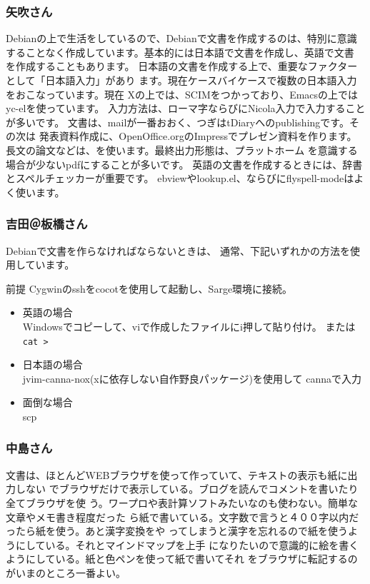 \documentclass[mingoth,a4paper]{jsarticle}
\begin{document}
\subsubsection{矢吹さん}

Debianの上で生活をしているので、Debianで文書を作成するのは、特別に意識
することなく作成しています。基本的には日本語で文書を作成し、英語で文書
を作成することもあります。
日本語の文書を作成する上で、重要なファクターとして「日本語入力」があり
ます。現在ケースバイケースで複数の日本語入力をおこなっています。現在
Xの上では、SCIMをつかっており、Emacsの上ではyc-elを使っています。
入力方法は、ローマ字ならびにNicola入力で入力することが多いです。
文書は、mailが一番おおく、つぎはtDiaryへのpublishingです。その次は
発表資料作成に、OpenOffice.orgのImpressでプレゼン資料を作ります。
長文の論文などは、\pLaTeX を使います。最終出力形態は、プラットホーム
を意識する場合が少ないpdfにすることが多いです。
英語の文書を作成するときには、辞書とスペルチェッカーが重要です。
ebviewやlookup.el、ならびにflyspell-modeはよく使います。

\subsubsection{吉田＠板橋さん}

Debianで文書を作らなければならないときは、
通常、下記いずれかの方法を使用しています。

前提
Cygwinのsshをcocotを使用して起動し、Sarge環境に接続。

\begin{itemize}
 \item 英語の場合 \\
	Windowsでコピーして、viで作成したファイルにi押して貼り付け。
	または\verb!cat >!

 \item 日本語の場合 \\
       jvim-canna-nox(xに依存しない自作野良パッケージ)を使用して
       cannaで入力

 \item 面倒な場合 \\
	scp
\end{itemize}

\subsubsection{中島さん}

文書は、ほとんどWEBブラウザを使って作っていて、テキストの表示も紙に出力しない
でブラウザだけで表示している。ブログを読んでコメントを書いたり全てブラウザを使
う。ワープロや表計算ソフトみたいなのも使わない。簡単な文章やメモ書き程度だった
ら紙で書いている。文字数で言うと４００字以内だったら紙を使う。あと漢字変換をや
ってしまうと漢字を忘れるので紙を使うようにしている。それとマインドマップを上手
になりたいので意識的に絵を書くようにしている。紙と色ペンを使って紙で書いてそれ
をブラウザに転記するのがいまのところ一番よい。
\end{document}
